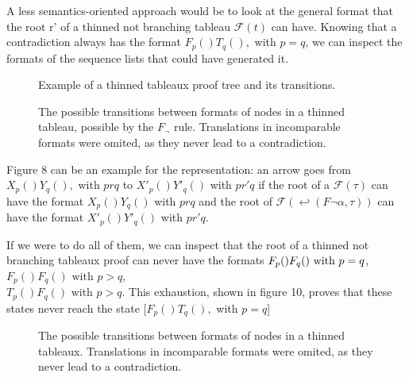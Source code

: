 \documentclass[runningheads]{llncs}
\begin{document}
 A less semantics-oriented approach would be to look at the general format that the root r' of a thinned not branching tableau $\mathcal{F}(t)$ can have. Knowing 
 that a contradiction always has the format  
 $F_p ( ) T_q ( ), $ with $ p = q$, 
 we can inspect the formats of the sequence lists that could have generated it.

 \begin{figure}
    \thinnedExampleImageI
    \thinnedExampleImageII
    \caption{Example of a thinned tableaux proof tree and its transitions.}
 \end{figure}

 \begin{figure}
 \nnn
 \caption{The possible transitions between formats of nodes in a thinned tableau, possible by the $F_\neg$ rule. Translations in incomparable formats were omited, as they never lead to a contradiction.}
 \label{figureneg}
 \end{figure}

 Figure 8 can be an example for the representation: an arrow goes from $X_p () Y_q (), $ with $ p r q $ to $X'_p () Y'_q ()  $ with $ p r' q $ if the root of a $\mathcal{F}(\tau)$ can have the format $X_p () Y_q ()  $ with $ p r q $
  and the root of $\mathcal{F}(\hookleftarrow(F \neg \alpha ,\tau))$
 can have the format $X'_p () Y'_q () $ with $ p r' q $. 

     

If we were to do all of them, we can inspect that the root  of a thinned not branching tableaux proof can never have 
the formats $\\ F_p () F_q () \text{ with }  p=q$, \\ $F_p () F_q ()  \text{ with }  p>q$, \\$T_p () F_q () \text{ with } p>q$.
This exhaustion, shown in figure 10, proves that these states never reach the state [$F_p ( ) T_q ( ), $ with $ p = q$]

\begin{figure}
    \fs
    \caption{The possible transitions between formats of nodes in a thinned tableaux. Translations in incomparable formats were omited, as they never lead to a contradiction.}
    \label{figuretotal}
\end{figure}
\end{document}
